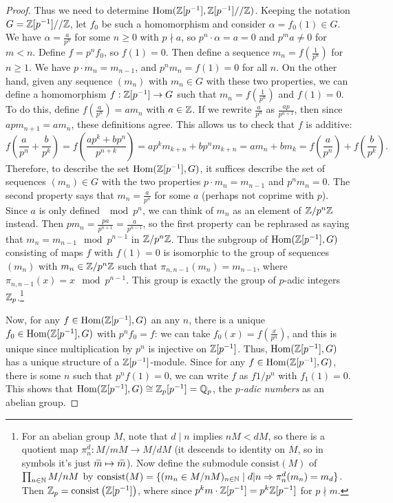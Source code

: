 \begin{proof}
    Thus we need to determine $\operatorname{Hom}(\mathbb{Z}[p^{-1}],\mathbb{Z}[p^{-1}]/\slash \mathbb{Z})$. Keeping the notation $G=\mathbb{Z}[p^{-1}]/\slash \mathbb{Z}$, let $f_0$ be such a homomorphism and consider $\alpha=f_0(1)\in G$. We have $\alpha=\frac{a}{p^n}$ for some $n\geq 0$ with $p\nmid a$, so $p^n\cdot \alpha=a=0$ and $p^ma\neq 0$ for $m<n$. Define $f=p^nf_0$, so $f(1)=0$. Then define a sequence $m_n=f\left(\frac{1}{p^n}\right)$ for $n\geq 1$. We have $p\cdot m_n=m_{n-1}$, and $p^n m_n=f(1)=0$ for all $n$. On the other hand, given any sequence $(m_n)$ with $m_n\in G$ with these two properties, we can define a homomorphism $f:\mathbb{Z}[p^{-1}]\to G$ such that $m_n=f\left(\frac{1}{p^n}\right)$  and $f(1)=0$. To do this, define $f\left(\frac{a}{p^n}\right)=am_n$ with $a\in\mathbb{Z}$. If we rewrite $\frac{a}{p^n}$ as $\frac{ap}{p^{n+1}}$, then since $apm_{n+1}=am_n$, these definitions agree. This allows us to check that $f$ is additive:
    \[f\left(\frac{a}{p^n}+\frac{b}{p^k}\right)=f\left(\frac{ap^k+bp^n}{p^{n+k}}\right)=ap^km_{k+n}+bp^nm_{k+n}=am_n+bm_k=f\left(\frac{a}{p^n}\right)+f\left(\frac{b}{p^k}\right).\]
    Therefore, to describe the set $\operatorname{Hom}(\mathbb{Z}[p^{-1}],G)$, it suffices describe the set of sequences $(m_n)\in G$ with the two properties $p\cdot m_n=m_{n-1}$ and $p^nm_n=0$. The second property says that $m_n=\frac{a}{p^n}$ for some $a$ (perhaps not coprime with $p$). Since $a$ is only defined $\mod p^n$, we can think of $m_n$ as an element of $\mathbb{Z}\slash p^n\mathbb{Z}$ instead. Then $pm_n=\frac{pa}{p^{n+1}}=\frac{a}{p^{n-1}}$, so the first property can be rephrased as saying that $m_n=m_{n-1}\mod p^{n-1}$ in $\mathbb{Z}\slash p^n\mathbb{Z}$. Thus the subgroup of $\operatorname{Hom}(\mathbb{Z}[p^{-1}],G)$ consisting of maps $f$ with $f(1)=0$ is isomorphic to the group of sequences $(m_n)$ with $m_n\in\mathbb{Z}\slash p^n\mathbb{Z}$ such that $\pi_{n,n-1}(m_n)=m_{n-1}$, where $\pi_{n,n-1}(x)=x\mod p^{n-1}$. This group is exactly the group of $p$-adic integers $\mathbb{Z}_p$.\footnote{For an abelian group $M$, note that $d\mid n$ implies $nM<dM$, so there is a quotient map $\pi_n^d:M\slash mM\to M\slash dM$ (it descends to identity on $M$, so in symbols it's just $\wb{m}\mapsto \wb{m}$). Now define the submodule $\mathrm{consist}(M)$ of $\prod_{n\in\mathbb{N}}M\slash nM$ by $\mathrm{consist}(M)=\{(m_n\in M\slash nM)_{n\in\mathbb{N}}\mid d|n\Rightarrow \pi_n^d(m_n)=m_d\}$. Then $\mathbb{Z}_p=\mathrm{consist}\left(\mathbb{Z}[p^{-1}]\right)$, where  since $p^km\cdot\mathbb{Z}[p^{-1}]=p^k\mathbb{Z}[p^{-1}]$ for $p\nmid m$.}

    Now, for any $f\in\operatorname{Hom}(\mathbb{Z}[p^{-1}],G)$ an any $n$, there is a unique $f_0\in\operatorname{Hom}(\mathbb{Z}[p^{-1}],G)$ with $p^nf_0=f$: we can take $f_0(x)=f\left(\frac{x}{p^n}\right)$, and this is unique since multiplication by $p^n$ is injective on $\mathbb{Z}[p^{-1}]$. Thus, $\operatorname{Hom}(\mathbb{Z}[p^{-1}],G)$ has a unique structure of a $\mathbb{Z}[p^{-1}]$-module. Since for any $f\in \operatorname{Hom}(\mathbb{Z}[p^{-1}],G)$, there is some $n$ such that $p^nf(1)=0$, we can write $f$ as $f1/p^n$  with $f_1(1)=0$. This shows that $\operatorname{Hom}(\mathbb{Z}[p^{-1}],G)\cong \mathbb{Z}_p[p^{-1}]=\mathbb{Q}_p$, the \emph{$p$-adic numbers} as an abelian group.
    

\end{proof}
